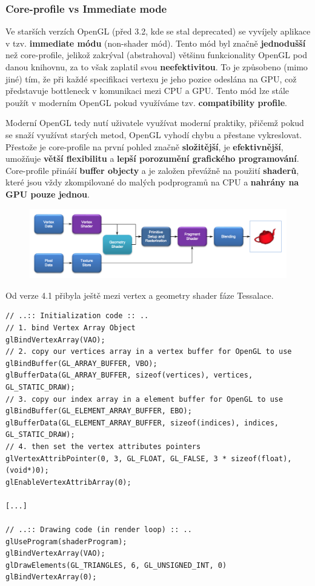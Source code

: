 \subsubsection{Core-profile vs Immediate mode}
Ve starších verzích OpenGL (před 3.2, kde se stal deprecated) se vyvíjely aplikace v tzv. \textbf{immediate módu} (non-shader mód). Tento mód byl značně \textbf{jednodušší} než core-profile, jelikož zakrýval (abstrahoval) většinu funkcionality OpenGL pod danou knihovnu, za to však zaplatil svou \textbf{neefektivitou}. To je způsobeno (mimo jiné) tím, že při každé specifikaci vertexu je jeho pozice odeslána na GPU, což představuje bottleneck v komunikaci mezi CPU a GPU. Tento mód lze stále použít v moderním OpenGL pokud využíváme tzv. \textbf{compatibility profile}.

Moderní OpenGL tedy nutí uživatele využívat moderní praktiky, přičemž pokud se snaží využívat starých metod, OpenGL vyhodí chybu a přestane vykreslovat. Přestože je core-profile na první pohled značně \textbf{složitější}, je \textbf{efektivnější}, umožňuje \textbf{větší flexibilitu} a \textbf{lepší porozumění grafického programování}. Core-profile přináší \textbf{buffer objecty} a je založen převážně na použití \textbf{shaderů}, které jsou vždy zkompilované do malých podprogramů na CPU a \textbf{nahrány na GPU pouze jednou}.

\begin{figure}[H]
	\centering
	\includegraphics[width=\textwidth]{assets/5_opengl_pipe}
\end{figure}

Od verze 4.1 přibyla ještě mezi vertex a geometry shader fáze Tessalace.

\begin{verbatim}
// ..:: Initialization code :: ..
// 1. bind Vertex Array Object
glBindVertexArray(VAO);
// 2. copy our vertices array in a vertex buffer for OpenGL to use
glBindBuffer(GL_ARRAY_BUFFER, VBO);
glBufferData(GL_ARRAY_BUFFER, sizeof(vertices), vertices, GL_STATIC_DRAW);
// 3. copy our index array in a element buffer for OpenGL to use
glBindBuffer(GL_ELEMENT_ARRAY_BUFFER, EBO);
glBufferData(GL_ELEMENT_ARRAY_BUFFER, sizeof(indices), indices, GL_STATIC_DRAW);
// 4. then set the vertex attributes pointers
glVertexAttribPointer(0, 3, GL_FLOAT, GL_FALSE, 3 * sizeof(float), (void*)0);
glEnableVertexAttribArray(0);  

[...]

// ..:: Drawing code (in render loop) :: ..
glUseProgram(shaderProgram);
glBindVertexArray(VAO);
glDrawElements(GL_TRIANGLES, 6, GL_UNSIGNED_INT, 0)
glBindVertexArray(0);
\end{verbatim}

